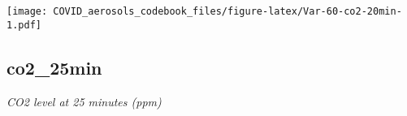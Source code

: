 \documentclass[]{article}
\begin{document}
\begin{minipage}{0.25 \textwidth}

\texttt{[image: COVID\_aerosols\_codebook\_files/figure-latex/Var-60-co2-20min-1.pdf]}

\end{minipage}

\noindent\makebox[\linewidth]{\rule{\textwidth}{0.4pt}}

\hypertarget{co2_25min}{%
\subsection{co2\_25min}\label{co2_25min}}

\emph{CO2 level at 25 minutes (ppm)}

\begin{minipage}{0.75 \textwidth}


\end{minipage}
\end{document}
